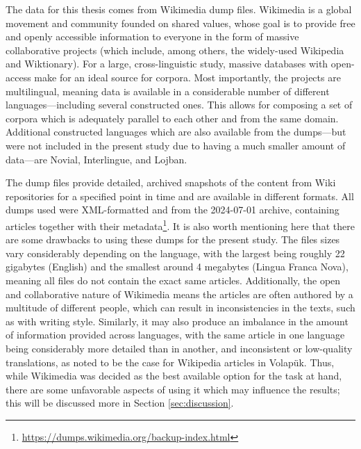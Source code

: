 \documentclass[12pt,a4paper]{article}
\numberwithin{figure}{section}
\numberwithin{table}{section}
\numberwithin{definition}{section}
\begin{document}
The data for this thesis comes from Wikimedia dump files. Wikimedia is a global movement and community founded on shared values, whose goal is to provide free and openly accessible information to everyone in the form of massive collaborative projects (which include, among others, the widely-used Wikipedia and Wiktionary). For a large, cross-linguistic study, massive databases with open-access make for an ideal source for corpora. Most importantly, the projects are multilingual, meaning data is available in a considerable number of different languages---including several constructed ones. This allows for composing a set of corpora which is adequately parallel to each other and from the same domain. Additional constructed languages which are also available from the dumps---but were not included in the present study due to having a much smaller amount of data---are Novial, Interlingue, and Lojban.

The dump files provide detailed, archived snapshots of the content from Wiki repositories for a specified point in time and are available in different formats. All dumps used were XML-formatted and from the 2024-07-01 archive, containing articles together with their metadata\footnote{\url{https://dumps.wikimedia.org/backup-index.html}}. It is also worth mentioning here that there are some drawbacks to using these dumps for the present study. The files sizes vary considerably depending on the language, with the largest being roughly 22 gigabytes (English) and the smallest around 4 megabytes (Lingua Franca Nova), meaning all files do not contain the exact same articles. Additionally, the open and collaborative nature of Wikimedia means the articles are often authored by a multitude of different people, which can result in inconsistencies in the texts, such as with writing style. Similarly, it may also produce an imbalance in the amount of information provided across languages, with the same article in one language being considerably more detailed than in another, and inconsistent or low-quality translations, as \textcite{Novikov2022article} noted to be the case for Wikipedia articles in Volapük. Thus, while Wikimedia was decided as the best available option for the task at hand, there are some unfavorable aspects of using it which may influence the results; this will be discussed more in Section \ref{sec:discussion}.

\end{document}
